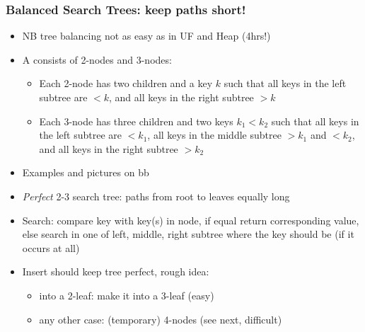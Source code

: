 \documentclass[handout]{beamer}
\begin{document}
\begin{frame}
    \frametitle{Balanced Search Trees: keep paths short!}

\begin{itemize}[<+->]
\item NB tree balancing not as easy as in UF and Heap (4hrs!)
\item A \href{https://en.wikipedia.org/wiki/2-3-tree}{\color{red}{2-3 search tree}} 
consists of 2-nodes and 3-nodes: 
  \begin{itemize}[<+->]
  \item Each 2-node has two children and a key $k$ such that all keys
  in the left subtree are $<k$, and all keys in the right subtree $>k$
  \item Each 3-node has three children and two keys $k_1 < k_2$ such that all keys
  in the left subtree are $<k_1$, all keys in the middle subtree
  $>k_1$ and $<k_2$, and all keys in the right subtree $>k_2$
  \end{itemize}
\item Examples and pictures on bb
\item \emph{Perfect}  2-3 search tree: paths from root to leaves equally long
\item Search: compare key with key(s) in node, if equal return corresponding value,
  else search in one of left, middle, right subtree where the key should be 
  (if it occurs at all)
\item Insert should keep tree perfect, rough idea:  
 \begin{itemize}[<+->]
 \item into a 2-leaf: make it into a 3-leaf (easy)
 \item any other case: (temporary) 4-nodes (see next, difficult)
 \end{itemize}     
\end{itemize}     
\end{frame}
\end{document}
